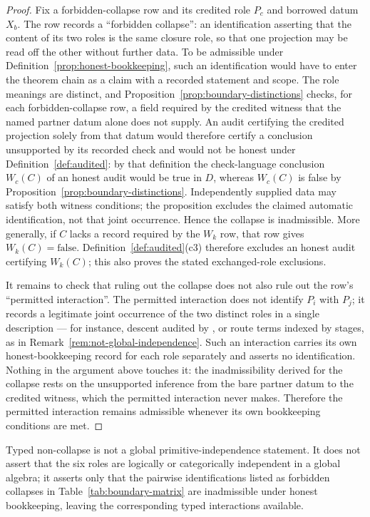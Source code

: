 \begin{proof}
Fix a forbidden-collapse row and its credited role \(P_c\) and borrowed datum \(X_b\). The row records a ``forbidden collapse'': an
identification asserting that the content of its two roles is the same
closure role, so that one
projection may be read off the other without further data. To be
admissible under Definition~\ref{prop:honest-bookkeeping}, such an
identification would have to enter the theorem chain as a claim with a
recorded statement and scope. The role meanings are distinct, and
Proposition~\ref{prop:boundary-distinctions} checks, for each
forbidden-collapse row, a field required by the credited witness that the
named partner datum alone does not supply. An audit certifying the credited
projection solely from that datum would therefore certify a conclusion
unsupported by its recorded check and would not be honest under
Definition~\ref{def:audited}: by that definition the check-language conclusion
\(W_c(C)\) of an honest audit would be true in \(D\), whereas \(W_c(C)\) is false by
Proposition~\ref{prop:boundary-distinctions}. Independently supplied data may satisfy both
witness conditions; the proposition excludes the claimed automatic
identification, not that joint occurrence. Hence the collapse is
inadmissible. More generally, if \(C\) lacks a record required by the \(W_k\) row, that row gives \(W_k(C)=\mathrm{false}\). Definition~\ref{def:audited}(c3) therefore excludes an honest audit certifying \(W_k(C)\); this also proves the stated exchanged-role exclusions.

It remains to check that ruling out the collapse does not also rule out
the row's ``permitted interaction''. The permitted interaction does not
identify \(P_i\) with \(P_j\); it records a legitimate joint occurrence
of the two distinct roles in a single description --- for instance,
\Pone{} descent audited by \Psix{}, or \Pthree{} route terms indexed by
\Pfour{} stages, as in Remark~\ref{rem:not-global-independence}. Such
an interaction carries its own honest-bookkeeping record for each role
separately and asserts no identification. Nothing in the argument above
touches it: the inadmissibility derived for the collapse rests on the unsupported
inference from the bare partner datum to the credited witness, which the
permitted interaction never makes. Therefore the permitted interaction remains admissible
whenever its own bookkeeping conditions are met.
\end{proof}

\begin{remark}\label{rem:typed-non-collapse-vs-independence}
Typed non-collapse is not a global primitive-independence statement. It does not assert that the six roles are logically or
categorically independent in a global algebra; it asserts only that
the pairwise identifications listed as forbidden collapses in
Table~\ref{tab:boundary-matrix} are inadmissible under honest
bookkeeping, leaving the corresponding typed interactions available.
\end{remark}


